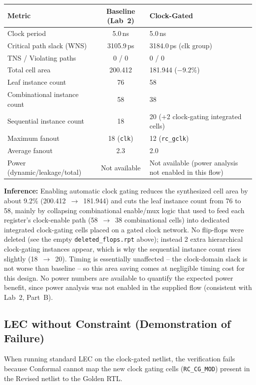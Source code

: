 \documentclass[12pt,a4paper]{article}
\begin{document}
\begin{center}
\begin{tabular}{|l|c|p{6.5cm}|}
\hline
\textbf{Metric} & \textbf{Baseline (Lab~2)} & \textbf{Clock-Gated} \\ \hline
Clock period & 5.0\,ns & 5.0\,ns \\ \hline
Critical path slack (WNS) & 3105.9\,ps & 3184.0\,ps (clk group) \\ \hline
TNS / Violating paths & 0 / 0 & 0 / 0 \\ \hline
Total cell area & 200.412 & 181.944 ($-9.2\%$) \\ \hline
Leaf instance count & 76 & 58 \\ \hline
Combinational instance count & 58 & 38 \\ \hline
Sequential instance count & 18 & 20 (+2 clock-gating integrated cells) \\ \hline
Maximum fanout & 18 (\texttt{clk}) & 12 (\texttt{rc\_gclk}) \\ \hline
Average fanout & 2.3 & 2.0 \\ \hline
Power (dynamic/leakage/total) & Not available & Not available (power analysis not enabled in this flow) \\ \hline
\end{tabular}
\end{center}

\noindent\textbf{Inference:} Enabling automatic clock gating reduces the synthesized cell area by
about 9.2\% (200.412~$\rightarrow$~181.944) and cuts the leaf instance count from 76 to 58, mainly
by collapsing combinational enable/mux logic that used to feed each register's clock-enable path
(58~$\rightarrow$~38 combinational cells) into dedicated integrated clock-gating cells placed on a
gated clock network. No flip-flops were deleted (see the empty \texttt{deleted\_flops.rpt} above);
instead 2 extra hierarchical clock-gating instances appear, which is why the sequential instance
count rises slightly (18~$\rightarrow$~20). Timing is essentially unaffected -- the clock-domain
slack is not worse than baseline -- so this area saving comes at negligible timing cost for this
design. No power numbers are available to quantify the expected power benefit, since power
analysis was not enabled in the supplied flow (consistent with Lab~2, Part~B).

\subsection*{LEC without Constraint (Demonstration of Failure)}
When running standard LEC on the clock-gated netlist, the verification fails because Conformal cannot map the new clock gating cells (\texttt{RC\_CG\_MOD}) present in the Revised netlist to the Golden RTL. 
\end{document}
